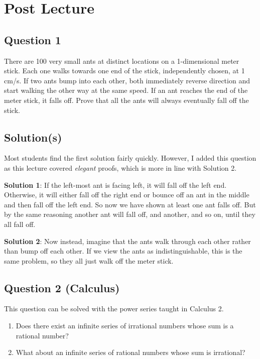 \documentclass{article}
\begin{document}
\section*{Post Lecture}

\subsection*{Question 1}
    There are 100 very small ants at distinct locations on a 1-dimensional meter stick. Each one walks towards one end of the stick, independently chosen, at 1 cm/s. If two ants bump into each other, both immediately reverse direction and start walking the other way at the same speed. If an ant reaches the end of the meter stick, it falls off. Prove that all the ants will always eventually fall off the stick.

\subsection*{Solution(s)}
    Most students find the first solution fairly quickly. However, I added this question as this lecture covered \textit{elegant} proofs, which is more in line with Solution 2.
    
    \vspace{1.5mm}
    \textbf{Solution 1}: If the left-most ant is facing left, it will fall off the left end. Otherwise, it will either fall off the right end or bounce off an ant in the middle and then fall off the left end. So now we have shown at least one ant falls off. But by the same reasoning another ant will fall off, and another, and so on, until they all fall off.
    
    \vspace{1.5mm}
    \textbf{Solution 2}: Now instead, imagine that the ants walk through each other rather than bump off each other. If we view the ants as indistinguishable, this is the same problem, so they all just walk off the meter stick.


\subsection*{Question 2 (Calculus)}
    This question can be solved with the power series taught in Calculus 2.
    \begin{enumerate}
        \item Does there exist an infinite series of irrational numbers whose sum is a rational number?
        \item What about an infinite series of rational numbers whose sum is irrational? 
    \end{enumerate}
\end{document}
